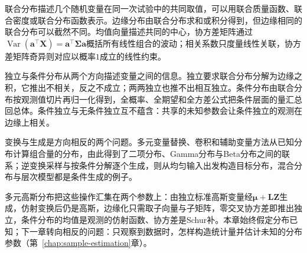 联合分布描述几个随机变量在同一次试验中的共同取值，可以用联合质量函数、联合密度或联合分布函数表示。边缘分布由联合分布求和或积分得到，但边缘相同的联合分布可以截然不同。均值向量描述共同的中心，协方差矩阵通过$\operatorname{Var}(\bm a^{\top}\bm X)=\bm a^{\top}\bm\Sigma\bm a$概括所有线性组合的波动；相关系数只度量线性关联，协方差矩阵奇异则对应以概率$1$成立的线性约束。

独立与条件分布从两个方向描述变量之间的信息。独立要求联合分布分解为边缘之积，它推出不相关，反之不成立；两两独立也推不出相互独立。条件分布由联合分布按观测值切片再归一化得到，全概率、全期望和全方差公式把条件层面的量汇总回总体。条件独立与无条件独立互不蕴含：共享的未知参数会让条件独立的观测在边缘上相关。

变换与生成是方向相反的两个问题。多元变量替换、卷积和辅助变量方法从已知分布计算组合量的分布，由此得到了二项分布、Gamma分布与Beta分布之间的联系；逆变换采样与按条件分解逐个生成，则从均匀输入出发构造目标分布，混合分布与层次模型都是条件生成的例子。

多元高斯分布把这些操作汇集在两个参数上：由独立标准高斯变量经$\bm\mu+\bm L\bm Z$生成，仿射变换后仍是高斯，边缘化只需取子向量与子矩阵，零交叉协方差即推出独立，条件分布的均值是观测的仿射函数、协方差是Schur补。本章始终假定分布已知；下一章转向相反的问题：只观察到数据时，怎样构造统计量并估计未知的分布参数（第~\ref{chap:sample-estimation}章）。
